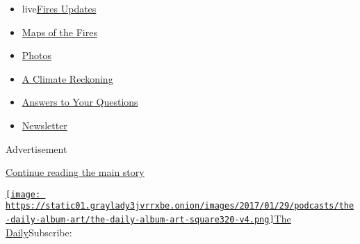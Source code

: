 \begin{itemize}
\tightlist
\item
  live\href{https://www.nytimes3xbfgragh.onion/2020/09/12/us/wildfires-live-updates.html?name=styln-california-wildfires\&region=TOP_BANNER\&block=storyline_menu_recirc\&action=click\&pgtype=Article\&impression_id=da837ab1-f52b-11ea-a2ac-3f128f7439bc\&variant=undefined}{Fires
  Updates}
\item
  \href{https://www.nytimes3xbfgragh.onion/interactive/2020/us/fires-map-tracker.html?name=styln-california-wildfires\&region=TOP_BANNER\&block=storyline_menu_recirc\&action=click\&pgtype=Article\&impression_id=da837ab2-f52b-11ea-a2ac-3f128f7439bc\&variant=undefined}{Maps
  of the Fires}
\item
  \href{https://www.nytimes3xbfgragh.onion/article/wildfires-photos-california-oregon-washington-state.html?name=styln-california-wildfires\&region=TOP_BANNER\&block=storyline_menu_recirc\&action=click\&pgtype=Article\&impression_id=da83a1c0-f52b-11ea-a2ac-3f128f7439bc\&variant=undefined}{Photos}
\item
  \href{https://www.nytimes3xbfgragh.onion/2020/09/10/us/climate-change-california-wildfires.html?name=styln-california-wildfires\&region=TOP_BANNER\&block=storyline_menu_recirc\&action=click\&pgtype=Article\&impression_id=da83a1c1-f52b-11ea-a2ac-3f128f7439bc\&variant=undefined}{A
  Climate Reckoning}
\item
  \href{https://www.nytimes3xbfgragh.onion/article/wildfires-california-oregon-washington.html?name=styln-california-wildfires\&region=TOP_BANNER\&block=storyline_menu_recirc\&action=click\&pgtype=Article\&impression_id=da83a1c2-f52b-11ea-a2ac-3f128f7439bc\&variant=undefined}{Answers
  to Your Questions}
\item
  \href{https://www.nytimes3xbfgragh.onion/2020/09/09/us/california-wildfires.html?name=styln-california-wildfires\&region=TOP_BANNER\&block=storyline_menu_recirc\&action=click\&pgtype=Article\&impression_id=da83a1c3-f52b-11ea-a2ac-3f128f7439bc\&variant=undefined}{Newsletter}
\end{itemize}

Advertisement

\protect\hyperlink{after-top}{Continue reading the main story}

\href{https://www.nytimes3xbfgragh.onion/column/the-daily}{\texttt{[image: https://static01.graylady3jvrrxbe.onion/images/2017/01/29/podcasts/the-daily-album-art/the-daily-album-art-square320-v4.png]}The
Daily}Subscribe:

